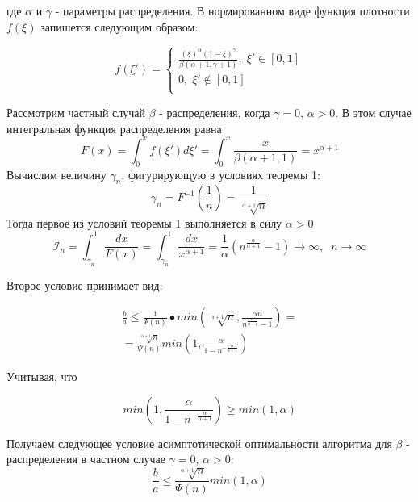 \documentclass[a4paper, 14pt]{extarticle}
\numberwithin{equation}{section}
\begin{document}
где $\alpha$ и $\gamma$ - параметры распределения. В нормированном виде функция плотности $f(\xi)$ запишется следующим образом:

\begin{equation}
f(\xi') = 
\begin{cases}
   \frac{(\xi)^\alpha (1-\xi)^\gamma}{ \beta(\alpha+1, \gamma+1)}, \;  \xi' \in [0,1]\\
   0, \;  \xi' \notin [0,1] \\
 \end{cases}
\end{equation}

Рассмотрим частный случай $\beta$ - распределения, когда $\gamma=0$, $\alpha>0$. В этом случае интегральная функция распределения равна
\begin{equation}
F(x) = \int_0^x f(\xi')d\xi' = \int_0^x \frac{x}{\beta(\alpha+1,1)} = x^{\alpha+1}
\end{equation} 
Вычислим величину $\gamma_n$, фигурирующую в условиях теоремы 1:
\begin{equation}
\gamma_n = F^{-1}(\frac{1}{n}) = \frac{1}{\sqrt[\alpha+1]{n}}
\end{equation}
Тогда первое из условий теоремы 1 выполняется в силу $\alpha>0$
\begin{equation}
\mathcal{I}_n = \int_{\gamma_n}^1 \frac{dx}{F(x)} = \int_{\gamma_n}^1 \frac{dx}{x^{\alpha+1}} = \frac{1}{\alpha} (n^{\frac{\alpha}{\alpha+1}}-1) \rightarrow \infty, \; \; n\rightarrow \infty
\end{equation}

Второе условие принимает вид:

\begin{equation}
\begin{aligned}
\frac{b}{a} \leq \frac{1}{\Psi(n)}•min(\sqrt[\alpha+1]{n}, \frac{\alpha n}{n^{\frac{\alpha}{\alpha+1}}-1}) = \\
=\frac{\sqrt[\alpha+1]{n}}{\Psi(n)} min(1, \frac{\alpha}{1-n^{-\frac{\alpha}{\alpha+1}}})
\end{aligned}
\end{equation}

Учитывая, что

\begin{equation}
min(1, \frac{\alpha}{1-n^{-\frac{\alpha}{\alpha+1}}}) \geq min(1, \alpha)
\end{equation}

Получаем следующее условие асимптотической оптимальности алгоритма \text{\algorithm} для $\beta$ - распределения в частном случае $\gamma=0$, $\alpha>0$:
\begin{equation}
\frac{b}{a} \leq \frac{\sqrt[\alpha+1]{n}}{\Psi(n)}min(1,\alpha)
\end{equation}
\end{document}

